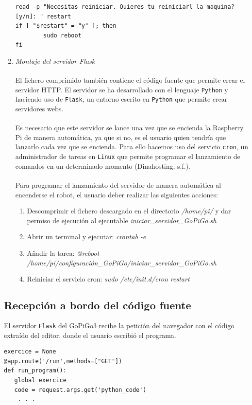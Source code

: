 \documentclass{report}
\begin{document}
\begin{enumerate}
\begin{lstlisting}[frame=single,breaklines=true, label=Ejecutable para la instalación y configuración de la Raspberry Pi, caption=Ejecutable para la instalación y configuración de la Raspberry Pi,  captionpos=b]
read -p "Necesitas reiniciar. Quieres tu reiniciarl la maquina? [y/n]: " restart
if [ "$restart" = "y" ]; then
        sudo reboot
fi
	\end{lstlisting}
	\item \textit{Montaje del servidor Flask}
	\\
	\\
	El fichero comprimido también contiene el código fuente que permite crear el servidor HTTP. El servidor se ha desarrollado con el lenguaje \texttt {Python} y haciendo uso de \texttt{Flask}, un entorno escrito en \texttt{Python} que permite crear servidores webs.
	\\
	\\
	Es necesario que este servidor se lance una vez que se encienda la Raspberry Pi de manera automática, ya que si no, es el usuario quien tendría que lanzarlo cada vez que se encienda. Para ello hacemos uso del servicio \texttt{cron}, un administrador de tareas en \texttt{Linux} que permite programar el lanzamiento de comandos en un determinado momento (Dinahosting, s.f.).
	\\
	\\
	Para programar el lanzamiento del servidor de manera automática al encenderse el robot, el usuario deber realizar las siguientes acciones:
	\begin{enumerate}
		\item Descomprimir el fichero descargado en el directorio \textit{/home/pi/} y dar permiso de ejecución al ejecutable \textit{iniciar\_servidor\_GoPiGo.sh}
		\item Abrir un terminal y ejecutar:  \textit{crontab -e}
		\item Añadir la tarea: \textit{@reboot /home/pi/configuración\_GoPiGo/iniciar\_servidor\_GoPiGo.sh}
		\item Reiniciar el servicio cron: \textit{sudo /etc/init.d/cron restart}
	\end{enumerate}
\end{enumerate}

\subsection{Recepción a bordo del código fuente}

El servidor \texttt{Flask} del GoPiGo3 recibe la petición del navegador con el código extraído del editor, donde el usuario escribió el programa.
\\
\begin{lstlisting}[frame=single,breaklines=true, label=Extracción del código en el servidor del GoPiGo3, caption=Extracción del código en el servidor del GoPiGo3,  captionpos=b]
exercice = None
@app.route('/run',methods=["GET"])
def run_program():
   global exercice
   code = request.args.get('python_code')
    . . .
\end{lstlisting}
\end{document}
